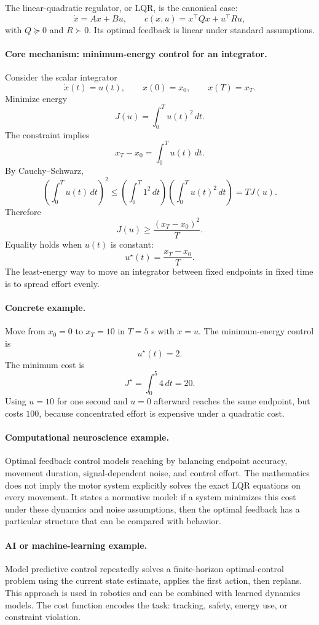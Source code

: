 The linear-quadratic regulator, or LQR, is the canonical case:
\[
\dot x=Ax+Bu,\qquad
c(x,u)=x^\top Qx+u^\top Ru,
\]
with \(Q\succeq0\) and \(R\succ0\). Its optimal feedback is linear under standard assumptions.

\paragraph{Core mechanism: minimum-energy control for an integrator.}
Consider the scalar integrator
\[
\dot x(t)=u(t),\qquad x(0)=x_0,\qquad x(T)=x_T.
\]
Minimize energy
\[
J(u)=\int_0^T u(t)^2\,dt.
\]
The constraint implies
\[
x_T-x_0=\int_0^T u(t)\,dt.
\]
By Cauchy--Schwarz,
\[
\left(\int_0^T u(t)\,dt\right)^2
\leq
\left(\int_0^T 1^2\,dt\right)
\left(\int_0^T u(t)^2\,dt\right)
=TJ(u).
\]
Therefore
\[
J(u)\geq \frac{(x_T-x_0)^2}{T}.
\]
Equality holds when \(u(t)\) is constant:
\[
u^\star(t)=\frac{x_T-x_0}{T}.
\]
The least-energy way to move an integrator between fixed endpoints in fixed time is to spread effort evenly.

\paragraph{Concrete example.}
Move from \(x_0=0\) to \(x_T=10\) in \(T=5\) s with \(\dot x=u\). The minimum-energy control is
\[
u^\star(t)=2.
\]
The minimum cost is
\[
J^\star=\int_0^5 4\,dt=20.
\]
Using \(u=10\) for one second and \(u=0\) afterward reaches the same endpoint, but costs \(100\), because concentrated effort is expensive under a quadratic cost.

\paragraph{Computational neuroscience example.}
Optimal feedback control models reaching by balancing endpoint accuracy, movement duration, signal-dependent noise, and control effort. The mathematics does not imply the motor system explicitly solves the exact LQR equations on every movement. It states a normative model: if a system minimizes this cost under these dynamics and noise assumptions, then the optimal feedback has a particular structure that can be compared with behavior.

\paragraph{AI or machine-learning example.}
Model predictive control repeatedly solves a finite-horizon optimal-control problem using the current state estimate, applies the first action, then replans. This approach is used in robotics and can be combined with learned dynamics models. The cost function encodes the task: tracking, safety, energy use, or constraint violation.

